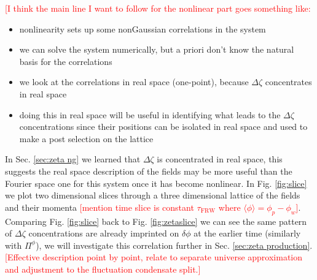 

\textcolor{red}{[I think the main line I want to follow for the nonlinear part goes something like:}
  \begin{itemize}
    \color{red}
    \item nonlinearity sets up some nonGaussian correlations in the system
    \item we can solve the system numerically, but a priori don't know the natural basis for the correlations
    \item we look at the correlations in real space (one-point), because $\Delta\zeta$ concentrates in real space
    \item doing this in real space will be useful in identifying what leads to the $\Delta\zeta$ concentrations since their positions can be isolated in real space and used to make a post selection on the lattice
  \end{itemize}
      
In Sec. \ref{sec:zeta ng} we learned that $\Delta\zeta$ is concentrated in real space, this suggests the real space description of the fields may be more useful than the Fourier space one for this system once it has become nonlinear. In Fig. \ref{fig:slice} we plot two dimensional slices through a three dimensional lattice of the fields and their momenta \textcolor{red}{[mention time slice is constant $\tau_\mathrm{FRW}$ where $\langle\phi\rangle=\phi_p-\phi_w$]}. Comparing Fig. \ref{fig:slice} back to Fig. \ref{fig:zetaslice} we can see the same pattern of $\Delta\zeta$ concentrations are already imprinted on $\delta\phi$ at the earlier time (similarly with $\Pi^\phi$), we will investigate this correlation further in Sec. \ref{sec:zeta production}.
\textcolor{red}{[Effective description point by point, relate to separate universe approximation and adjustment to the fluctuation condensate split.]}

\Fslice


